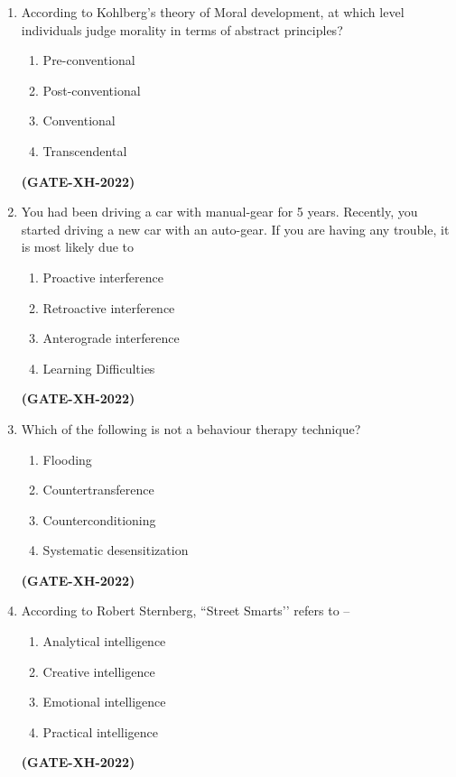 \documentclass[journal]{IEEEtran}
\begin{document}
\begin{enumerate}
\item According to Kohlberg’s theory of Moral development, at which level individuals judge morality in terms of abstract principles?
\begin{multicols}{2}
\begin{enumerate}
\item Pre-conventional
\item Post-conventional
\item Conventional
\item Transcendental
\end{enumerate}
\end{multicols}
\hfill\textbf{(GATE-XH-2022)}

\item You had been driving a car with manual-gear for 5 years. Recently, you started driving a new car with an auto-gear. If you are having any trouble, it is most likely due to
\begin{multicols}{2}
\begin{enumerate}
\item Proactive interference
\item Retroactive interference
\item Anterograde interference
\item Learning Difficulties
\end{enumerate}
\end{multicols}
\hfill\textbf{(GATE-XH-2022)}

\item Which of the following is not a behaviour therapy technique?
\begin{multicols}{2}
\begin{enumerate}
\item Flooding
\item Countertransference
\item Counterconditioning
\item Systematic desensitization
\end{enumerate}
\end{multicols}
\hfill\textbf{(GATE-XH-2022)}

\item According to Robert Sternberg, ``Street Smarts’’ refers to –
\begin{multicols}{2}
\begin{enumerate}
\item Analytical intelligence
\item Creative intelligence
\item Emotional intelligence
\item Practical intelligence
\end{enumerate}
\end{multicols}
\hfill\textbf{(GATE-XH-2022)}


\end{enumerate}
\end{document}
